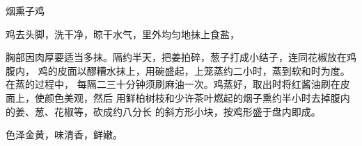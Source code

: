 %
%
%
%
%
%
%
\begin{recipe}{烟熏子鸡}

\ingredients


\preparation

鸡去头脚，洗干净，晾干水气，里外均匀地抹上食盐，

胸部因肉厚要适当多抹。隔约半天，把姜拍碎，葱子打成小结子，连同花椒放在鸡腹内，
鸡的皮面以醪糟水抹上，用碗盛起，上笼蒸约二小时，蒸到软和时为度。在蒸的过程中，
每隔二三十分钟须刷麻油一次。鸡蒸好，取出时将红酱油刷在皮面上，使颜色美观，然后
用鲜柏树枝和少许茶叶燃起的烟子熏约半小时去掉腹内的姜、葱、花椒等，砍成约八分长
的斜方形小块，按鸡形盛于盘内即成。

\features

色泽金黄，味清香，鲜嫩。

\end{recipe}


